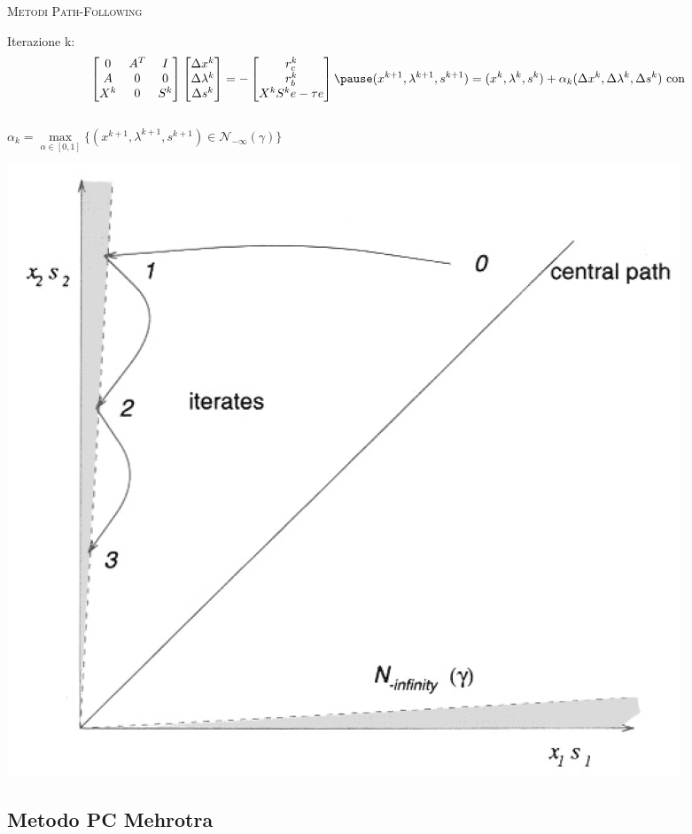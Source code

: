 
\begin{frame}[t]{\textsc{\LARGE \textcolor{burntumber}{Metodi Path-Following}}}
\begin{block}{Iterazione k:}
	\begin{equation*}	
	\begin{bmatrix}
	0&A^{T}&I \\A& 0&0\\X^{k}&0&S^{k}
	\end{bmatrix}\begin{bmatrix}
	\Delta x^{k}\\\Delta\lambda^{k} \\\Delta s^{k}
	\end{bmatrix}=-\begin{bmatrix}
	r_{c}^{k}\\r_{b}^{k}\\X^{k}S^{k}e-\tau e
	\end{bmatrix}\\
	\pause
	(x^{k+1}, \lambda^{k+1}, s^{k+1}) = (x^{k}, \lambda^{k}, s^{k})+ \alpha_{k}(\Delta x^{k}, \Delta\lambda^{k}, \Delta s^{k}) \text{ con}
	\end{equation*}\\
	$ \alpha_{k} = \max\limits_{\alpha \in[0,1]}\{(x^{k+1}, \lambda^{k+1}, s^{k+1})\in\mathcal{N}_{-\infty}(\gamma)\}$
\end{block}
\pause
\centering \includegraphics[width = 3.5 cm]{LPF.PNG}	
\end{frame}


\subsection{Metodo PC Mehrotra}

